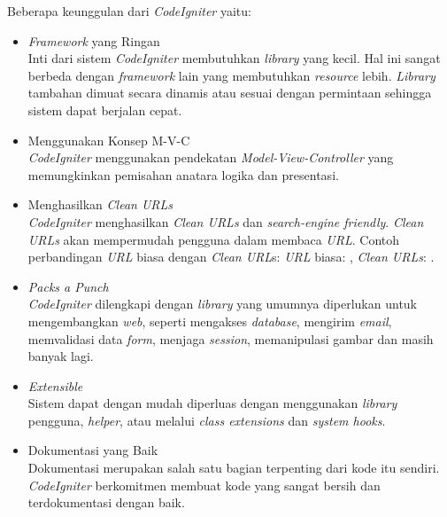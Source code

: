 Beberapa keunggulan dari \textit{CodeIgniter} yaitu:
\begin{itemize}
	\item \textit{Framework} yang Ringan \\
		Inti dari sistem \textit{CodeIgniter} membutuhkan \textit{library} yang kecil. Hal ini sangat berbeda dengan \textit{framework} lain yang membutuhkan \textit{resource} lebih. \textit{Library} tambahan dimuat secara dinamis atau sesuai dengan permintaan sehingga sistem dapat berjalan cepat.
	\item Menggunakan Konsep M-V-C \\
		\textit{CodeIgniter} menggunakan pendekatan \textit{Model-View-Controller} yang memungkinkan pemisahan anatara logika dan presentasi.
	\item Menghasilkan \textit{Clean URLs} \\
		\textit{CodeIgniter} menghasilkan \textit{Clean URLs} dan \textit{search-engine friendly}. \textit{Clean URLs} akan mempermudah pengguna dalam membaca \textit{URL}. Contoh perbandingan \textit{URL} biasa dengan \textit{Clean URL}s: \textit{URL} biasa: , \textit{Clean URLs}: .
	\item \textit{Packs a Punch} \\
		\textit{CodeIgniter} dilengkapi dengan \textit{library} yang umumnya diperlukan untuk mengembangkan \textit{web}, seperti mengakses \textit{database}, mengirim \textit{email}, memvalidasi data \textit{form}, menjaga \textit{session}, memanipulasi gambar dan masih banyak lagi.
	\item \textit{Extensible} \\
		Sistem dapat dengan mudah diperluas dengan menggunakan \textit{library} pengguna, \textit{helper}, atau melalui \textit{class extensions} dan \textit{system hooks}.
	\item Dokumentasi yang Baik \\
		Dokumentasi merupakan salah satu bagian terpenting dari kode itu sendiri. \textit{CodeIgniter} berkomitmen membuat kode yang sangat bersih dan terdokumentasi dengan baik. 
\end{itemize}

